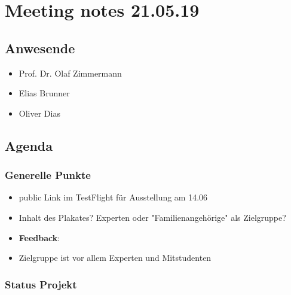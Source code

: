\hypertarget{meeting-notes-210519}{%
\section*{Meeting notes 21.05.19}\label{meeting-notes-210519}}

\hypertarget{anwesende}{%
\subsection*{Anwesende}\label{anwesende}}

\begin{itemize}
 
\item Prof. Dr. Olaf Zimmermann
\item Elias Brunner
\item Oliver Dias
\end{itemize}

\hypertarget{agenda}{%
\subsection*{Agenda}\label{agenda}}

\hypertarget{generelle-punkte}{%
\subsubsection*{Generelle Punkte}\label{generelle-punkte}}

\begin{itemize}
 
\item public Link im TestFlight für Ausstellung am 14.06
\item Inhalt des Plakates? Experten oder "Familienangehörige" als Zielgruppe? 
\item \textbf{Feedback}:
\item Zielgruppe ist vor allem Experten und Mitstudenten
\end{itemize}

\hypertarget{status-projekt}{%
\subsubsection*{Status Projekt}\label{status-projekt}}

